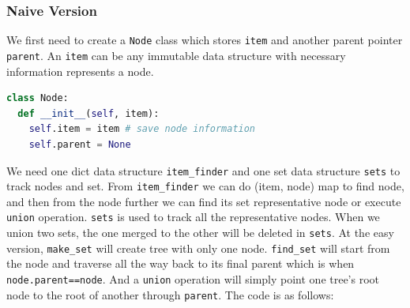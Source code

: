 \documentclass[../main.tex]{subfiles}
\begin{document}
\subsubsection{Naive Version} We first need to create a \texttt{Node} class which stores \texttt{item} and another parent pointer \texttt{parent}. An \texttt{item} can be any immutable data structure with necessary information represents a node.
\begin{lstlisting}[language=Python]
class Node:
  def __init__(self, item):
    self.item = item # save node information
    self.parent = None
\end{lstlisting}

We need one dict data structure \texttt{item\_finder} and one set data structure \texttt{sets} to track nodes and set. From \texttt{item\_finder} we can do (item, node) map to find node, and then from the node further we can find its set representative node or execute \texttt{union} operation. \texttt{sets} is used to track all the representative nodes. When we union two sets, the one merged to the other will be deleted in \texttt{sets}. At the easy version, \texttt{make\_set} will create  tree with only one node. \texttt{find\_set} will start from the node and traverse all the way back to its final parent which is when \texttt{node.parent==node}. And a \texttt{union} operation will simply point one tree's root node to the root of another through \texttt{parent}. The code is as follows:
\end{document}
